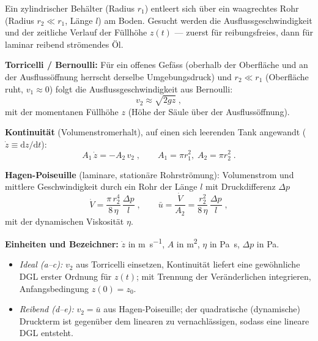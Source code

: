 

Ein zylindrischer Behälter (Radius $r_1$) entleert sich über ein waagrechtes
Rohr (Radius $r_2\ll r_1$, Länge $l$) am Boden. Gesucht werden die
Ausflussgeschwindigkeit und der zeitliche Verlauf der Füllhöhe $z(t)$ ---
zuerst für reibungsfreies, dann für laminar reibend strömendes Öl.

\begin{werkzeugkasten}[Werkzeuge]
\textbf{Torricelli / Bernoulli:} Für ein offenes Gefäss (oberhalb der
Oberfläche und an der Ausflussöffnung herrscht derselbe Umgebungsdruck) und
$r_2\ll r_1$ (Oberfläche ruht, $v_1\approx 0$) folgt die
Ausflussgeschwindigkeit aus Bernoulli:
\begin{equation}
  v_2 \approx \sqrt{2gz}\;,
\end{equation}
mit der momentanen Füllhöhe $z$ (Höhe der Säule über der Ausflussöffnung).

\textbf{Kontinuität} (Volumenstromerhalt), auf einen sich leerenden Tank
angewandt ($\dot z\equiv \mathrm dz/\mathrm dt$):
\begin{equation}
  A_1\,\dot z = -A_2\,v_2\;,\qquad
  A_1=\pi r_1^2,\; A_2=\pi r_2^2\;.
\end{equation}

\textbf{Hagen-Poiseuille} (laminare, stationäre Rohrströmung): Volumenstrom
und mittlere Geschwindigkeit durch ein Rohr der Länge $l$ mit
Druckdifferenz $\Delta p$
\begin{equation}
  \dot V=\frac{\pi\,r_2^4}{8\,\eta}\,\frac{\Delta p}{l}\;,\qquad
  \bar u=\frac{\dot V}{A_2}
  =\frac{r_2^2}{8\,\eta}\,\frac{\Delta p}{l}\;,
\end{equation}
mit der dynamischen Viskosität $\eta$.

\textbf{Einheiten und Bezeichner:} $\dot z$ in \unit{\metre\per\second},
$A$ in \unit{\square\metre}, $\eta$ in \unit{\pascal\second},
$\Delta p$ in \unit{\pascal}.
\end{werkzeugkasten}

\begin{werkzeugkasten}
\begin{itemize}
  \item \emph{Ideal (a--c):} $v_2$ aus Torricelli einsetzen, Kontinuität liefert
       eine gewöhnliche DGL erster Ordnung für $z(t)$; mit Trennung der
       Veränderlichen integrieren, Anfangsbedingung $z(0)=z_0$.
  \item \emph{Reibend (d--e):} $v_2=\bar u$ aus Hagen-Poiseuille; der
       quadratische (dynamische) Druckterm ist gegenüber dem linearen zu
       vernachlässigen, sodass eine lineare DGL entsteht.
\end{itemize}
\end{werkzeugkasten}

